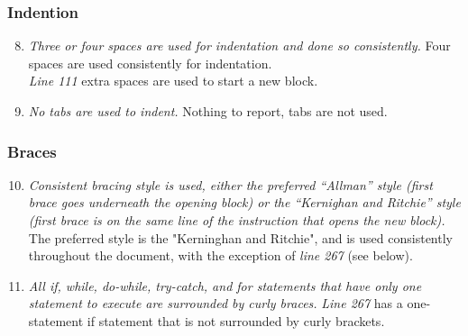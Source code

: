 	\subsubsection{Indention}
		\begin{enumerate}
			\setcounter{enumi}{7}
			\item \textit{Three or four spaces are used for indentation and done so consistently.}\newline
			Four spaces are used consistently for indentation. \\
			\textit{Line 111} extra spaces are used to start a new block.

			\item \textit{No tabs are used to indent.}\newline
			Nothing to report, tabs are not used. 

		\end{enumerate}

	\subsubsection{Braces}
		\begin{enumerate}
			\setcounter{enumi}{9}
			\item \textit{Consistent bracing style is used, either the preferred “Allman” style (first brace goes underneath the opening block) or the “Kernighan and Ritchie” style (first brace is on the same line of the instruction that opens the new block).}\newline
			The preferred style is the "Kerninghan and Ritchie", and is used consistently throughout the document, with the exception of \textit{line 267} (see below).

			\item \textit{All if, while, do-while, try-catch, and for statements that have only one statement to execute are surrounded by curly braces.}
			\textit{Line 267} has a one-statement if statement that is not surrounded by curly brackets. 
			
		\end{enumerate}

